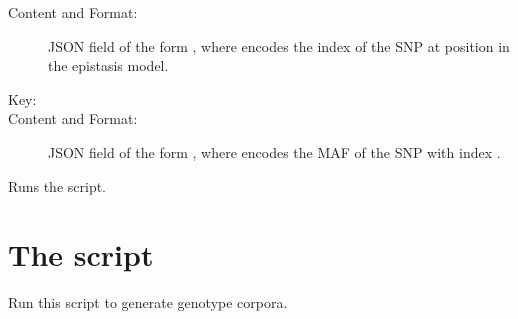 \documentclass[a4paper,10pt,english]{sphinxhowto}
\begin{document}
\begin{description}
\begin{description}
\begin{description}
\item[{Content and Format:}] \leavevmode
JSON field of the form , where  encodes the index of the SNP at position 
in the epistasis model.

\end{description}

\item[{\sphinxcode{\sphinxupquote{\textless{}MAF\_DATA\textgreater{}}}}] \leavevmode\begin{description}
\item[{Key:}] \leavevmode
{}

\item[{Content and Format:}] \leavevmode
JSON field of the form , where  encodes the MAF of
the SNP with index .

\end{description}

\end{description}

\end{description}

\begin{fulllineitems}
\label{\detokenize{simulate_data:simulate_data.run_script}}
Runs the script.

\end{fulllineitems}



\section{The script }
\label{\detokenize{generate_genotype_corpus:module-generate_genotype_corpus}}\label{\detokenize{generate_genotype_corpus:the-script-generate-genotype-corpus-py}}\label{\detokenize{generate_genotype_corpus::doc}}
Run this script to generate genotype corpora.
\end{document}

